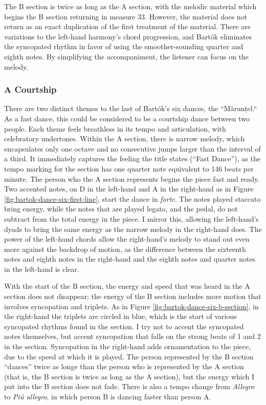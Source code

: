 The B section is twice as long as the A section, with the melodic material which begins the B section returning in measure 33. However, the material does not return as an exact duplication of the first treatment of the material. There are variations to the left-hand harmony's chord progression, and Bartók eliminates the syncopated rhythm in favor of using the smoother-sounding quarter and eighth notes. By simplifying the accompaniment, the listener can focus on the melody.

\subsubsection{A Courtship}

There are two distinct themes to the last of Bartók's six dances, the ``Mărunțel.`` As a fast dance, this could be considered to be a courtship dance between two people. Each theme feels breathless in its tempo and articulation, with celebratory undertones. Within the A section, there is narrow melody, which encapsulates only one octave and no consecutive jumps larger than the interval of a third. It immediately captures the feeling the title states (``Fast Dance''), as the tempo marking for the section has one quarter note equivalent to 146 beats per minute. The person who the A section represents begins the piece fast and ready. Two accented notes, on D in the left-hand and A in the right-hand as in Figure \ref{fig:bartok-dance-six-first-line}\autocite{Lung_2016}, start the dance in \textit{forte}. The notes played staccato bring energy, while the notes that are played legato, and the pedal, do not subtract from the total energy in the piece. I mirror this, allowing the left-hand's dyads to bring the same energy as the narrow melody in the right-hand does. The power of the left-hand chords allow the right-hand's melody to stand out even more against the backdrop of motion, as the difference between the sixteenth notes and eighth notes in the right-hand and the eighth notes and quarter notes in the left-hand is clear. 

With the start of the B section, the energy and speed that was heard in the A section does not disappear; the energy of the B section includes more motion that involves syncopation and triplets. As in Figure \ref{fig:bartok-dance-six-b-section}\autocite{Lung_2016}, in the right-hand the triplets are circled in blue, which is the start of various syncopated rhythms found in the section. I try not to accent the syncopated notes themselves, but accent syncopation that falls on the strong beats of 1 and 2 in the section. Syncopation in the right-hand adds ornamentation to the piece, due to the speed at which it is played. The person represented by the B section ``dances'' twice as longe than the person who is represented by the A section (that is, the B section is twice as long as the A section), but the energy which I put into the B section does not fade. There is also a tempo change from \textit{Allegro} to \textit{Piú allegro}, in which person B is dancing faster than person A.